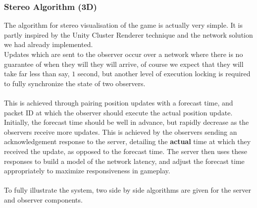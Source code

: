 \documentclass[11pt,a4paper]{article}
\begin{document}
  \subsubsection{Stereo Algorithm (3D)}

  The algorithm for stereo visualisation of the game is actually very simple. It is partly inspired by the Unity Cluster Renderer technique and the network solution we had already implemented. \\
  Updates which are sent to the observer occur over a network where there is no guarantee of when they will they will arrive, of course we expect that they will take far less than say, $1$ second, but another level of execution locking is required to fully synchronize the state of two observers. \\ \\
  This is achieved through pairing position updates with a forecast time, and packet ID at which the observer should execute the actual position update. Initially, the forecast time should be well in advance, but rapidly decrease as the observers receive more updates. This is achieved by the observers sending an acknowledgement response to the server, detailing the \textbf{actual} time at which they received the update, as opposed to the forecast time. The server then uses these responses to build a model of the network latency, and adjust the forecast time appropriately to maximize responsiveness in gameplay. \\ \\

\noindent 
  To fully illustrate the system, two side by side algorithms are given for the server and observer components. \\ \\

\end{document}
